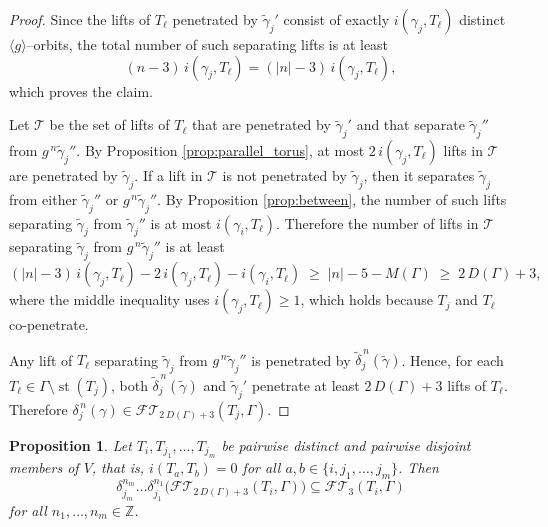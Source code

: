 \documentclass[12pt,a4paper]{amsart}
\numberwithin{equation}{section}
\newcommand{\ZZ}{\mathbb{Z}}
\theoremstyle{plain}
\newtheorem{proposition}[theorem]{Proposition}
\theoremstyle{definition}
\theoremstyle{remark}
\begin{document}
\begin{proof}
    Since the lifts of $T_\ell$ penetrated by $\tilde{\gamma}_j'$ consist of exactly $i(\gamma_j, T_\ell)$ distinct $\langle g \rangle$--orbits, the total number of such separating lifts is at least
    \[
        (n-3)\, i(\gamma_j, T_\ell) = (\lvert n \rvert - 3)\, i(\gamma_j, T_\ell),
    \]
    which proves the claim.

    Let $\mathcal{T}$ be the set of lifts of $T_\ell$ that are penetrated by $\tilde{\gamma}_j'$ and that separate $\tilde{\gamma}_j''$ from $g^{\,n}\tilde{\gamma}_j''$.
    By Proposition \ref{prop:parallel_torus}, at most $2\, i(\gamma_j, T_\ell)$ lifts in $\mathcal{T}$ are penetrated by $\tilde{\gamma}_j$.
    If a lift in $\mathcal{T}$ is not penetrated by $\tilde{\gamma}_j$, then it separates $\tilde{\gamma}_j$ from either $\tilde{\gamma}_j''$ or $g^{\,n}\tilde{\gamma}_j''$.
    By Proposition \ref{prop:between}, the number of such lifts separating $\tilde{\gamma}_j$ from $\tilde{\gamma}_j''$ is at most $i(\gamma_i, T_\ell)$.
    Therefore the number of lifts in $\mathcal{T}$ separating $\tilde{\gamma}_j$ from $g^{\,n}\tilde{\gamma}_j''$ is at least
    \[
        (\lvert n \rvert - 3)\, i(\gamma_j, T_\ell) - 2\, i(\gamma_j, T_\ell) - i(\gamma_i, T_\ell)
        \;\ge\; \lvert n \rvert - 5 - M(\Gamma)
        \;\ge\; 2\,D(\Gamma) + 3,
    \]
    where the middle inequality uses $i(\gamma_j, T_\ell) \ge 1$, which holds because $T_j$ and $T_\ell$ co-penetrate.

    Any lift of $T_\ell$ separating $\tilde{\gamma}_j$ from $g^{\,n}\tilde{\gamma}_j''$ is penetrated by $\tilde{\delta}_j^{\,n}(\tilde{\gamma})$.
    Hence, for each $T_\ell \in \Gamma \setminus \operatorname{st}(T_j)$, both $\tilde{\delta}_j^{\,n}(\tilde{\gamma})$ and $\tilde{\gamma}_j'$ penetrate at least $2\,D(\Gamma) + 3$ lifts of $T_\ell$.
    Therefore $\delta_j^{\,n}(\gamma) \in \mathcal{FT}\!_{2\,D(\Gamma)+3}(T_j, \Gamma)$.
\end{proof}

\begin{proposition} \label{prop:commuting}
    Let $T_i, T_{j_1}, \dots, T_{j_m}$ be pairwise distinct and pairwise disjoint members of $V$, that is, $i(T_a, T_b) = 0$ for all $a, b \in \{i, j_1, \dots, j_m\}$.
    Then
    \[
        \delta_{j_m}^{n_m} \dots \delta_{j_1}^{n_1}\bigl(\mathcal{FT}\!_{2\,D(\Gamma)+3}(T_i, \Gamma)\bigr) \subseteq \mathcal{FT}\!_3(T_i, \Gamma)
    \]
    for all $n_1, \dots, n_m \in \ZZ$.
\end{proposition}
\end{document}
